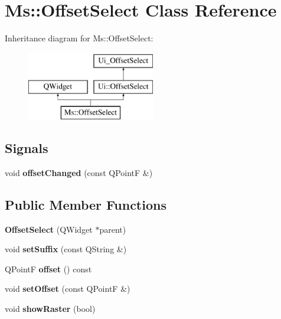 \hypertarget{class_ms_1_1_offset_select}{}\section{Ms\+:\+:Offset\+Select Class Reference}
\label{class_ms_1_1_offset_select}
Inheritance diagram for Ms\+:\+:Offset\+Select\+:\begin{figure}[H]
\begin{center}
\leavevmode
\includegraphics[height=3.000000cm]{class_ms_1_1_offset_select}
\end{center}
\end{figure}
\subsection*{Signals}
\begin{DoxyCompactItemize}
\item 
\mbox{\label{class_ms_1_1_offset_select_a05df390db14898522bdbece541281912}} 
void {\bfseries offset\+Changed} (const Q\+PointF \&)
\end{DoxyCompactItemize}
\subsection*{Public Member Functions}
\begin{DoxyCompactItemize}
\item 
\mbox{\label{class_ms_1_1_offset_select_a3fd81b69546884e1d52fc59c4c1671b6}} 
{\bfseries Offset\+Select} (Q\+Widget $\ast$parent)
\item 
\mbox{\label{class_ms_1_1_offset_select_a11024b7970dda593a6266ff3758afbca}} 
void {\bfseries set\+Suffix} (const Q\+String \&)
\item 
\mbox{\label{class_ms_1_1_offset_select_ac0454bef55a8e680666838430e85e695}} 
Q\+PointF {\bfseries offset} () const
\item 
\mbox{\label{class_ms_1_1_offset_select_ab483dd9d46b5e65ac1775233a1b6c50f}} 
void {\bfseries set\+Offset} (const Q\+PointF \&)
\item 
\mbox{\label{class_ms_1_1_offset_select_a758022d0978eed2cbfcc75906b731f71}} 
void {\bfseries show\+Raster} (bool)
\end{DoxyCompactItemize}
